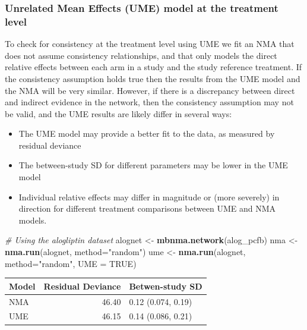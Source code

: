 \documentclass[]{article}
\newenvironment{Shaded}{\begin{snugshade}}{\end{snugshade}}
\newcommand{\CommentTok}[1]{\textcolor[rgb]{0.56,0.35,0.01}{\textit{#1}}}
\newcommand{\DataTypeTok}[1]{\textcolor[rgb]{0.13,0.29,0.53}{#1}}
\newcommand{\KeywordTok}[1]{\textcolor[rgb]{0.13,0.29,0.53}{\textbf{#1}}}
\newcommand{\NormalTok}[1]{#1}
\newcommand{\OtherTok}[1]{\textcolor[rgb]{0.56,0.35,0.01}{#1}}
\newcommand{\StringTok}[1]{\textcolor[rgb]{0.31,0.60,0.02}{#1}}
\providecommand{\tightlist}{%
  \setlength{\itemsep}{0pt}\setlength{\parskip}{0pt}}
\begin{document}
\hypertarget{unrelated-mean-effects-ume-model-at-the-treatment-level}{%
\subsubsection{Unrelated Mean Effects (UME) model at the treatment
level}\label{unrelated-mean-effects-ume-model-at-the-treatment-level}}

To check for consistency at the treatment level using UME we fit an NMA
that does not assume consistency relationships, and that only models the
direct relative effects between each arm in a study and the study
reference treatment. If the consistency assumption holds true then the
results from the UME model and the NMA will be very similar. However, if
there is a discrepancy between direct and indirect evidence in the
network, then the consistency assumption may not be valid, and the UME
results are likely differ in several ways:

\begin{itemize}
\tightlist
\item
  The UME model may provide a better fit to the data, as measured by
  residual deviance
\item
  The between-study SD for different parameters may be lower in the UME
  model
\item
  Individual relative effects may differ in magnitude or (more severely)
  in direction for different treatment comparisons between UME and NMA
  models.
\end{itemize}

\begin{Shaded}
\begin{Highlighting}[]
\CommentTok{# Using the alogliptin dataset}
\NormalTok{alognet <-}\StringTok{ }\KeywordTok{mbnma.network}\NormalTok{(alog_pcfb)}
\NormalTok{nma <-}\StringTok{ }\KeywordTok{nma.run}\NormalTok{(alognet, }\DataTypeTok{method=}\StringTok{"random"}\NormalTok{)}
\NormalTok{ume <-}\StringTok{ }\KeywordTok{nma.run}\NormalTok{(alognet, }\DataTypeTok{method=}\StringTok{"random"}\NormalTok{, }\DataTypeTok{UME =} \OtherTok{TRUE}\NormalTok{)}
\end{Highlighting}
\end{Shaded}

\begin{longtable}[]{@{}lrl@{}}
\toprule
Model & Residual Deviance & Betwen-study SD\tabularnewline
\midrule
\endhead
NMA & 46.40 & 0.12 (0.074, 0.19)\tabularnewline
UME & 46.15 & 0.14 (0.086, 0.21)\tabularnewline
\bottomrule
\end{longtable}
\end{document}

